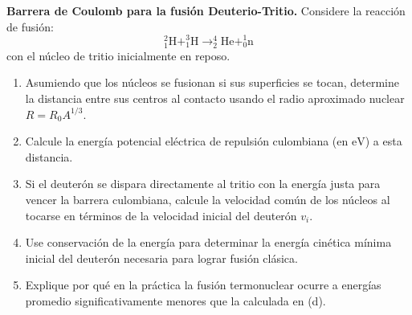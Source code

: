 \item \textbf{Barrera de Coulomb para la fusión Deuterio-Tritio.}
Considere la reacción de fusión:
$$ ^{2}_{1}\text{H} + ^{3}_{1}\text{H} \to ^{4}_{2}\text{He} + ^{1}_{0}\text{n} $$
con el núcleo de tritio inicialmente en reposo.
\begin{enumerate}
    \item Asumiendo que los núcleos se fusionan si sus superficies se tocan, determine la distancia entre sus centros al contacto usando el radio aproximado nuclear $R = R_0 A^{1/3}$.
    \item Calcule la energía potencial eléctrica de repulsión culombiana (en $\text{eV}$) a esta distancia.
    \item Si el deuterón se dispara directamente al tritio con la energía justa para vencer la barrera culombiana, calcule la velocidad común de los núcleos al tocarse en términos de la velocidad inicial del deuterón $v_i$.
    \item Use conservación de la energía para determinar la energía cinética mínima inicial del deuterón necesaria para lograr fusión clásica.
    \item Explique por qué en la práctica la fusión termonuclear ocurre a energías promedio significativamente menores que la calculada en (d).
\end{enumerate}